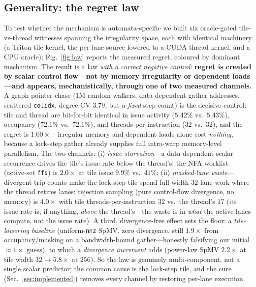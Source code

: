 \documentclass[conference]{IEEEtran}
\begin{document}
\subsection{Generality: the regret law}\label{sec:law}
To test whether the mechanism is automata-specific we built six oracle-gated tile-vs-thread witnesses
spanning the irregularity space, each with identical machinery (a Triton tile kernel, the per-lane
source lowered to a CUDA thread kernel, and a CPU oracle); Fig.~\ref{fig:law} reports the measured
regret, coloured by dominant mechanism. The result is a law \emph{with a correct negative control}:
\textbf{regret is created by scalar control flow---not by memory irregularity or dependent loads---and
appears, mechanistically, through one of two measured channels.} A graph pointer-chase (1M random
walkers, data-dependent gather addresses, scattered \texttt{colidx}, degree CV $3.79$, but a
\emph{fixed} step count) is the decisive control: tile and thread are bit-for-bit identical in issue
activity ($5.42\%$ vs.\ $5.43\%$), occupancy ($72.1\%$ vs.\ $72.1\%$), and threads-per-instruction
($32$ vs.\ $32$), and the regret is $1.00\times$---irregular memory and dependent loads alone cost
\emph{nothing}, because a lock-step gather already supplies full intra-warp memory-level parallelism.
The two channels: (i) \emph{issue starvation}---a data-dependent scalar recurrence drives the tile's
issue rate below the thread's: the NFA worklist (active-set \texttt{ffs}) is $2.0\times$ at tile issue
$9.9\%$ vs.\ $41\%$; (ii) \emph{masked-lane waste}---divergent trip counts make the lock-step tile spend
full-width $32$-lane work where the thread retires lanes: rejection sampling (pure control-flow
divergence, no memory) is $4.0\times$ with tile threads-per-instruction $32$ vs.\ the thread's $17$
(its issue rate is, if anything, \emph{above} the thread's---the waste is in \emph{what} the active
lanes compute, not the issue rate). A third, divergence-free effect sets the floor: a
\emph{tile-lowering baseline} (uniform-\texttt{nnz} SpMV, zero divergence, still $1.9\times$ from
occupancy/masking on a bandwidth-bound gather---honestly falsifying our initial ${\approx}1\times$
guess), to which a \emph{divergence increment} adds (power-law SpMV $2.2\times$ at tile width
$32 \to 5.8\times$ at $256$). So the law is genuinely multi-component, not a single scalar predictor; the
common cause is the lock-step tile, and the cure (Sec.~\ref{sec:implemented}) removes every channel by
restoring per-lane execution.
\end{document}
